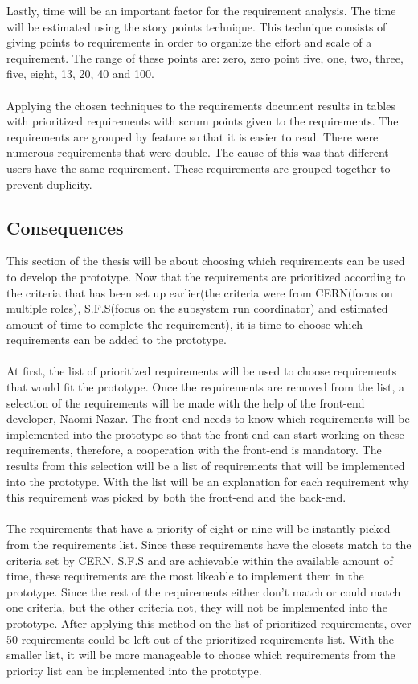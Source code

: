 \documentclass[paper=a4, fontsize=11pt,twoside]{scrartcl}	%
\begin{document}
Lastly, time will be an important factor for the requirement analysis. The time will be estimated using the story points technique. This technique consists of giving  points to requirements in order to organize the effort and scale of a requirement. The range of these points are:  zero, zero point five, one, two, three, five, eight, 13, 20, 40 and 100. \\ \\
Applying the chosen techniques to the requirements document results in tables with prioritized requirements with scrum points given to the requirements. The requirements are grouped by feature so that it is easier to read. There were numerous requirements that were double. The cause of this was that different users have the same requirement. These requirements are grouped together to prevent duplicity. \\

\newpage
\subsection{Consequences}
This section of the thesis will be about choosing which requirements can be used to develop the prototype. Now that the requirements are prioritized according to the criteria that has been set up earlier(the criteria were from CERN(focus on multiple roles), S.F.S(focus on the subsystem run coordinator) and estimated amount of time to complete the requirement), it is time to choose which requirements can be added to the prototype. \\ \\ 
At first, the list of prioritized requirements will be used to choose requirements that would fit the prototype. Once the requirements are removed from the list, a selection of the requirements will be made with the help of the front-end developer, Naomi Nazar. The front-end needs to know which requirements will be implemented into the prototype so that the front-end can start working on these requirements, therefore, a cooperation with the front-end is mandatory. The results from this selection will be a list of requirements that will be implemented into the prototype. With the list will be an explanation for each requirement why this requirement was picked by both the front-end and the back-end. \\ \\
The requirements that have a priority of eight or nine will be instantly picked from the requirements list. Since these requirements have the closets match to the criteria set by CERN, S.F.S and are achievable within the available amount of time, these requirements are the most likeable to implement them in the prototype. Since the rest of the requirements either don't match or could match one criteria, but the other criteria not, they will not be implemented into the prototype. After applying this method on the list of prioritized requirements, over 50 requirements could be left out of the prioritized requirements list. With the smaller list, it will be more manageable to choose which requirements from the priority list can be implemented into the prototype. \\
\end{document}
